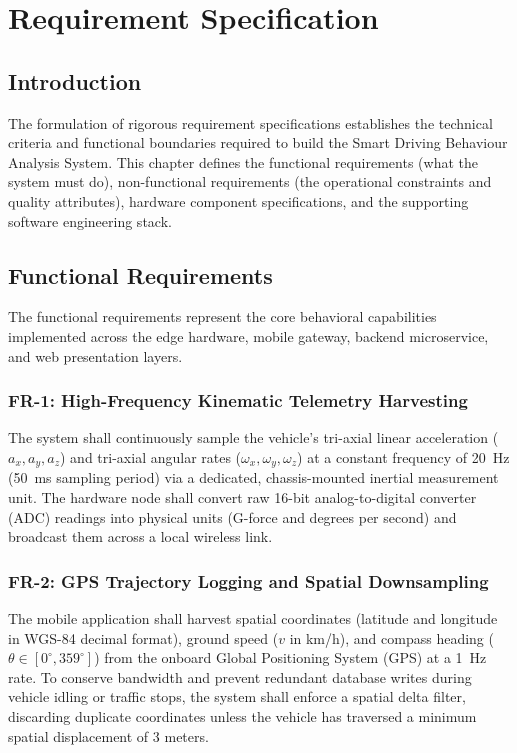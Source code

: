 \chapter{Requirement Specification}
\label{chap:requirements}

\section{Introduction}
\label{sec:req_intro}
The formulation of rigorous requirement specifications establishes the technical criteria and functional boundaries required to build the Smart Driving Behaviour Analysis System. This chapter defines the functional requirements (what the system must do), non-functional requirements (the operational constraints and quality attributes), hardware component specifications, and the supporting software engineering stack.

\section{Functional Requirements}
\label{sec:functional_reqs}
The functional requirements represent the core behavioral capabilities implemented across the edge hardware, mobile gateway, backend microservice, and web presentation layers.

\subsection{FR-1: High-Frequency Kinematic Telemetry Harvesting}
The system shall continuously sample the vehicle's tri-axial linear acceleration ($a_x, a_y, a_z$) and tri-axial angular rates ($\omega_x, \omega_y, \omega_z$) at a constant frequency of 20~Hz (50~ms sampling period) via a dedicated, chassis-mounted inertial measurement unit. The hardware node shall convert raw 16-bit analog-to-digital converter (ADC) readings into physical units (G-force and degrees per second) and broadcast them across a local wireless link.

\subsection{FR-2: GPS Trajectory Logging and Spatial Downsampling}
The mobile application shall harvest spatial coordinates (latitude and longitude in WGS-84 decimal format), ground speed ($v$ in km/h), and compass heading ($\theta \in [0^\circ, 359^\circ]$) from the onboard Global Positioning System (GPS) at a 1~Hz rate. To conserve bandwidth and prevent redundant database writes during vehicle idling or traffic stops, the system shall enforce a spatial delta filter, discarding duplicate coordinates unless the vehicle has traversed a minimum spatial displacement of 3 meters.

